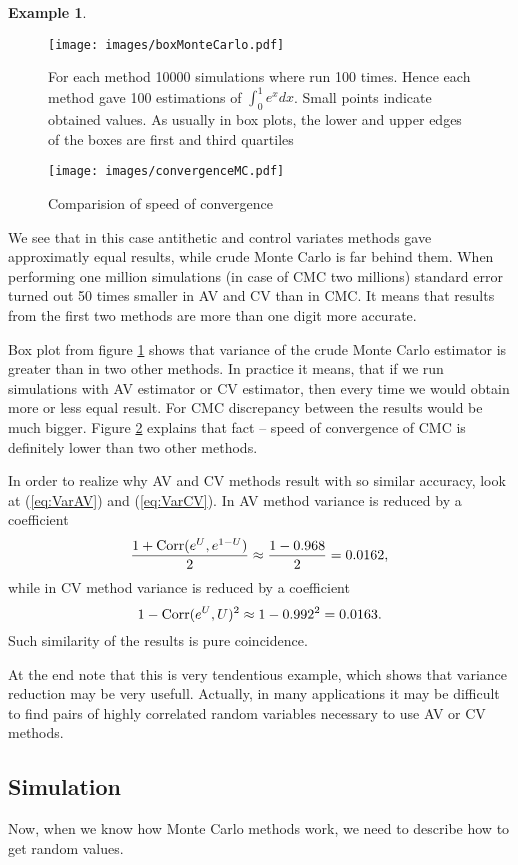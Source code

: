 \documentclass[a4paper,12pt, oneside]{book}
\theoremstyle{definition}
\newtheorem{example}{Example}[section]
\theoremstyle{remark}
\def\Corr{{\hbox{Corr}}}
\begin{document}
\begin{example}
\begin{figure}[h]
\centering
 \texttt{[image: images/boxMonteCarlo.pdf]}
\caption{For each method 10000 simulations where run 100 times. Hence each method gave 100 estimations of $\int_0^1 e^x dx$. Small points indicate obtained values. As usually in box plots, the lower and upper edges of the boxes are first and third quartiles  }
\label{fig:boxMC}
\end{figure}

\begin{figure}
\centering
 \texttt{[image: images/convergenceMC.pdf]}
\caption{Comparision of speed of convergence }
\label{fig:convergenceMC}
\end{figure}

We see that in this case antithetic and control variates methods gave approximatly equal results, while crude Monte Carlo is far behind them. When performing one million simulations (in case of CMC two millions) standard error turned out 50 times smaller in AV and CV than in CMC. It means that results from the first two methods are more than one digit more accurate.

Box plot from figure \ref{fig:boxMC} shows that variance of the crude Monte Carlo estimator is greater than in two other methods. In practice it means, that if we run simulations with AV estimator or CV estimator, then every time we would obtain more or less equal result. For CMC discrepancy between the results would be much bigger. Figure \ref{fig:convergenceMC} explains that fact -- speed of convergence of CMC is definitely lower than two other methods.

In order to realize why AV and CV methods result with so similar accuracy, look at (\ref{eq:VarAV}) and (\ref{eq:VarCV}). In AV method variance is reduced by a coefficient
\[ \frac{1 + \Corr(e^U, e^{1-U})}{2} \approx \frac{1 - 0.968}{2} = 0.0162, \]
while in CV method variance is reduced by a coefficient
\[ 1 - \Corr(e^U, U)^2 \approx 1 - 0.992^2 = 0.0163. \]
Such similarity of the results is pure coincidence.

At the end note that this is very tendentious example, which shows that variance reduction may be very usefull. Actually, in many applications it may be difficult to find pairs of highly correlated random variables necessary to use AV or CV methods.
\end{example}


\subsection{Simulation}
Now, when we know how Monte Carlo methods work, we need to describe how to get random values.
\end{document}
